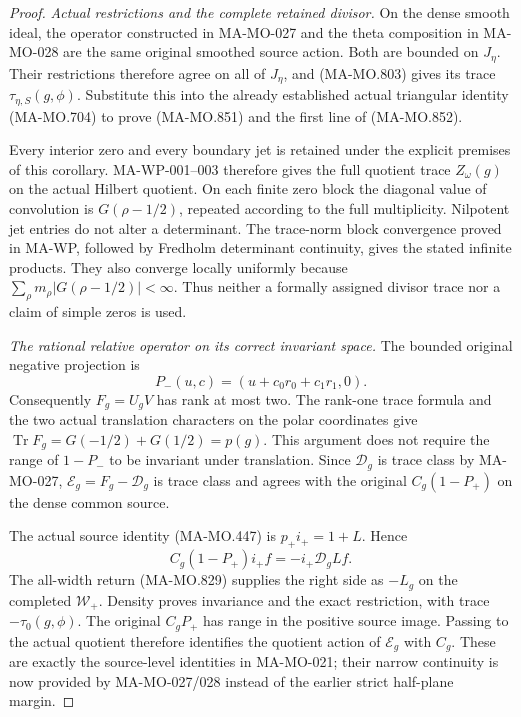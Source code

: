 \begin{proof}
\emph{Actual restrictions and the complete retained divisor.}
On the dense smooth ideal, the operator constructed in
MA-MO-027 and the theta composition in MA-MO-028
are the same original smoothed source action.
Both are bounded on \(J_\eta\). Their restrictions
therefore agree on all of \(J_\eta\), and
(MA-MO.803) gives its trace
\(\tau_{\eta,S}(g,\phi)\). Substitute this into
the already established actual triangular identity
(MA-MO.704) to prove (MA-MO.851) and the first
line of (MA-MO.852).

Every interior zero and every boundary jet is retained
under the explicit premises of this corollary.
MA-WP-001--003 therefore gives the full quotient
trace \(Z_\omega(g)\) on the actual Hilbert quotient.
On each finite zero block the diagonal value of
convolution is \(G(\rho-1/2)\), repeated according
to the full multiplicity. Nilpotent jet entries
do not alter a determinant. The trace-norm block
convergence proved in MA-WP, followed by Fredholm
determinant continuity, gives the stated infinite
products. They also converge locally uniformly
because \(\sum_\rho m_\rho|G(\rho-1/2)|<\infty\).
Thus neither a formally assigned divisor trace
nor a claim of simple zeros is used.

\emph{The rational relative operator on its correct invariant space.}
The bounded original negative projection is
\[
       P_-(u,c)=(u+c_0r_0+c_1r_1,0).
 \tag{MA-MO.859}
\]
Consequently \(F_g=U_gV\) has rank at most two.
The rank-one trace formula and the two actual
translation characters on the polar coordinates
give
\(\operatorname{Tr}F_g=G(-1/2)+G(1/2)=p(g)\).
This argument does not require the range of
\(1-P_-\) to be invariant under translation.
Since \(\mathscr D_g\) is trace class by
MA-MO-027, \(\mathscr E_g=F_g-\mathscr D_g\)
is trace class and agrees with the original
\(C_g(1-P_+)\) on the dense common source.

The actual source identity (MA-MO.447) is
\(p_+i_+=1+L\). Hence
\[
       C_g(1-P_+)i_+f=-i_+\mathcal D_gLf .
 \tag{MA-MO.860}
\]
The all-width return (MA-MO.829) supplies the
right side as \(-L_g\) on the completed
\(\mathcal W_+\). Density proves invariance
and the exact restriction, with trace
\(-\tau_0(g,\phi)\). The original \(C_gP_+\)
has range in the positive source image.
Passing to the actual quotient therefore
identifies the quotient action of
\(\mathscr E_g\) with \(C_g\). These are
exactly the source-level identities in
MA-MO-021; their narrow continuity is now
provided by MA-MO-027/028 instead of the
earlier strict half-plane margin.


\end{proof}
